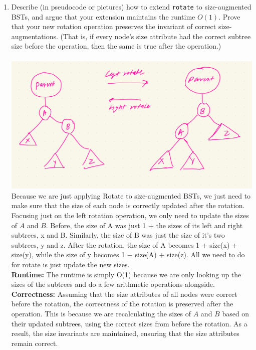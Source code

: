 \documentclass[11pt]{article}
\begin{document}
\begin{enumerate}
\begin{enumerate}
        \item Describe (in pseudocode or pictures) how to extend \texttt{rotate} to size-augmented BSTs, and argue that your extension maintains the runtime $O(1)$. Prove that your new rotation operation preserves the invariant of correct size-augmentations. (That is, if every node's size attribute had the correct subtree size before the operation, then the same is true after the operation.)
        \\\\ \includegraphics[scale = 0.1]{IMG_0130.jpg}
        \\Because we are just applying Rotate to size-augmented BSTs, we just need to make sure that the size of each node is correctly updated after the rotation. Focusing just on the left rotation operation, we only need to update the sizes of $A$ and $B$. Before, the size of A was just 1 + the sizes of its left and right subtrees, x and B. Similarly, the size of B was just the size of it's two subtrees, y and z. After the rotation, the size of A becomes 1 + size(x) + size(y), while the size of y becomes 1 + size(A) + size(z). All we need to do for rotate is just update the new sizes.
        \\ \textbf{Runtime:} The runtime is simply O(1) because we are only looking up the sizes of the subtrees and do a few arithmetic operations alongside.
        \\ \textbf{Correctness:} Assuming that the size attributes of all nodes were correct before the rotation, the correctness of the rotation is preserved after the operation. This is because we are recalculating the sizes of $A$ and $B$ based on their updated subtrees, using the correct sizes from before the rotation. As a result, the size invariants are maintained, ensuring that the size attributes remain correct. 
        

\end{enumerate}
\end{enumerate}
\end{document}
